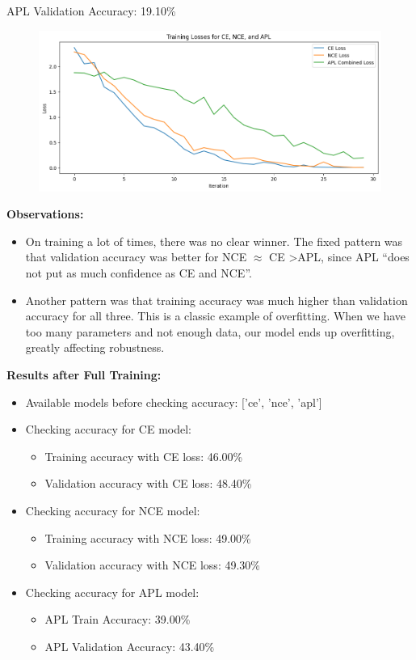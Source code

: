 \documentclass{article}
\begin{document}
APL Validation Accuracy: 19.10\%

\begin{figure}[htbp]
    \centering
    \includegraphics[width=\linewidth]{loss.png}  %
    \label{fig:your-label}
\end{figure}


\textbf{Observations:}
\begin{itemize}
    \item On training a lot of times, there was no clear winner. The fixed pattern was that validation accuracy was better for NCE \(\approx\) CE \textgreater APL, since APL “does not put as much confidence as CE and NCE”.
    \item Another pattern was that training accuracy was much higher than validation accuracy for all three. This is a classic example of overfitting. When we have too many parameters and not enough data, our model ends up overfitting, greatly affecting robustness.
\end{itemize}

\textbf{Results after Full Training:}




\begin{itemize}



    \item Available models before checking accuracy: ['ce', 'nce', 'apl']
    \item Checking accuracy for CE model:
    \begin{itemize}
        \item Training accuracy with CE loss: 46.00\%
        \item Validation accuracy with CE loss: 48.40\%
    \end{itemize}
    \item Checking accuracy for NCE model:
    \begin{itemize}
        \item Training accuracy with NCE loss: 49.00\%
        \item Validation accuracy with NCE loss: 49.30\%
    \end{itemize}
    \item Checking accuracy for APL model:
    \begin{itemize}
        \item APL Train Accuracy: 39.00\%
        \item APL Validation Accuracy: 43.40\%
    \end{itemize}
\end{itemize}
\end{document}
